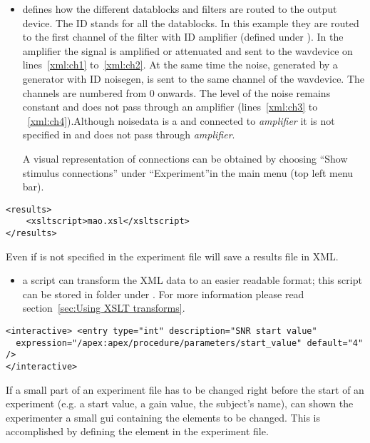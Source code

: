  

\begin{itemize}

\item {} defines how the different datablocks
and filters are routed to the output device. The ID 
stands for all the datablocks. In this example they are routed to
the first channel of the filter with ID {amplifier} (defined under
). In the amplifier the signal is amplified or
attenuated and sent to the wavdevice on lines~\ref{xml:ch1}
to~\ref{xml:ch2}. At the same time the noise, generated by a
generator with ID noisegen, is sent to the same channel of the
wavdevice. The channels are numbered from 0 onwards. The level of
the noise remains constant and does not pass through an amplifier
(lines~\ref{xml:ch3} to ~\ref{xml:ch4}).Although noisedata is a
 and connected to \emph{amplifier} it is not
specified in  and does not pass through
\emph{amplifier}.

A visual representation of connections can be obtained by choosing
``Show stimulus connections'' under ``Experiment''in the main
\apex menu (top left menu bar).

\end{itemize}

\begin{lstlisting}
<results>
    <xsltscript>mao.xsl</xsltscript>
</results>
\end{lstlisting}


 Even if  is not specified in
the experiment file \apex will save a results file in XML.

\begin{itemize}
\item {} a script can transform the XML data to
an easier readable format; this script can be stored in folder
 under \apex. For more information please read
section~\ref{sec:Using XSLT transforms}.
\end{itemize}

 

\begin{lstlisting}
<interactive> <entry type="int" description="SNR start value"
  expression="/apex:apex/procedure/parameters/start_value" default="4" />
</interactive>
\end{lstlisting}

If a small part of an experiment file has to be changed right
before the start of an experiment (e.g. a start value, a gain
value, the subject's name), \apex can shown the experimenter a
small \ac{gui} containing the elements to be changed. This is
accomplished by defining the  element in the
experiment file.

